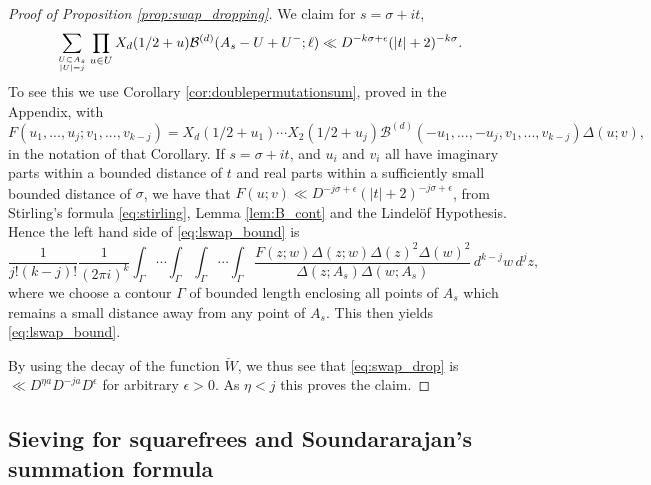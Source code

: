 \documentclass[12pt]{amsart}
\begin{document}
	\begin{proof} [Proof of Proposition \ref{prop:swap_dropping}]
		We claim for $s = \sigma + it$,
		\begin{equation}
			\label{eq:lswap_bound}
			\sum_{U \subset A_s \atop |U| = j} \prod_{u\in U} X_d(1/2+u) \mathcal{B}^{(d)}(A_s - U + U^{-};\ell) \ll D^{-k\sigma+\epsilon} (|t|+2)^{-k\sigma}.
		\end{equation}
		To see this we use Corollary \ref{cor:doublepermutationsum}, proved in the Appendix, with 
		$$
		F(u_1,...,u_j; v_1,...,v_{k-j}) = X_d(1/2+u_1) \cdots X_2(1/2+u_j) \mathcal{B}^{(d)}(-u_1,...,-u_j,v_1,...,v_{k-j})\Delta(u;v),
		$$
		in the notation of that Corollary. If $s = \sigma + it$, and $u_i$ and $v_i$ all have imaginary parts within a bounded distance of $t$ and real parts within a sufficiently small bounded distance of $\sigma$, we have that $F(u;v) \ll D^{-j\sigma+\epsilon} (|t|+2)^{-j\sigma+\epsilon}$, from Stirling's formula \eqref{eq:stirling}, Lemma \ref{lem:B_cont} and the Lindel\"of Hypothesis. Hence the left hand side of \eqref{eq:lswap_bound} is
		$$
		\frac{1}{j! (k-j)!} \frac{1}{(2\pi i)^k} \int_\Gamma \cdots \int_\Gamma  \int_\Gamma \cdots \int_\Gamma \frac{F(z;w) \Delta(z;w) \Delta(z)^2 \Delta(w)^2}{\Delta(z;A_s) \Delta(w;A_s)} \, d^{k-j}w \, d^j z, 
		$$
		where we choose a contour $\Gamma$ of bounded length enclosing all points of $A_s$ which remains a small distance away from any point of $A_s$. This then yields \eqref{eq:lswap_bound}.
		
		By using the decay of the function $\breve{W}$, we thus see that \eqref{eq:swap_drop} is $\ll D^{\eta a} D^{-j a} D^{\epsilon}$ for arbitrary $\epsilon > 0$. As $\eta < j$ this proves the claim.
	\end{proof}
	
	\subsection{Sieving for squarefrees and Soundararajan's summation formula}
	\label{subsec:poisson}
	
\end{document}
